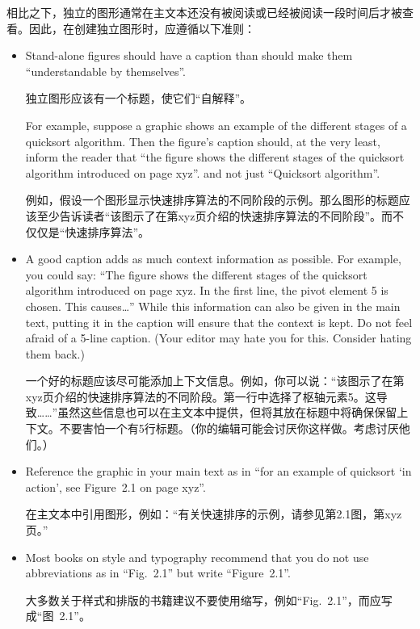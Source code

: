 相比之下，独立的图形通常在主文本还没有被阅读或已经被阅读一段时间后才被查看。因此，在创建独立图形时，应遵循以下准则：
%
\begin{itemize}
    \item Stand-alone figures should have a caption than should make them
        ``understandable by themselves''.

        独立图形应该有一个标题，使它们“自解释”。

        For example, suppose a graphic shows an example of the different
        stages of a quicksort algorithm. Then the figure's caption should, at
        the very least, inform the reader that ``the figure shows the
        different stages of the quicksort algorithm introduced on page xyz''.
        and not just ``Quicksort algorithm''.

        例如，假设一个图形显示快速排序算法的不同阶段的示例。那么图形的标题应该至少告诉读者“该图示了在第xyz页介绍的快速排序算法的不同阶段”。而不仅仅是“快速排序算法”。
    \item A good caption adds as much context information as possible. For
        example, you could say: ``The figure shows the different stages of
        the quicksort algorithm introduced on page xyz. In the first line,
        the pivot element 5 is chosen. This causes\dots'' While this
        information can also be given in the main text, putting it in the
        caption will ensure that the context is kept. Do not feel afraid of a
        5-line caption. (Your editor may hate you for this. Consider hating
        them back.)

        一个好的标题应该尽可能添加上下文信息。例如，你可以说：“该图示了在第xyz页介绍的快速排序算法的不同阶段。第一行中选择了枢轴元素5。这导致……”虽然这些信息也可以在主文本中提供，但将其放在标题中将确保保留上下文。不要害怕一个有5行标题。（你的编辑可能会讨厌你这样做。考虑讨厌他们。）
    \item Reference the graphic in your main text as in ``for an example of
        quicksort `in action', see Figure~2.1 on page xyz''.

        在主文本中引用图形，例如：“有关快速排序的示例，请参见第2.1图，第xyz页。”


    \item Most books on style and typography recommend that you do not use
        abbreviations as in ``Fig.~2.1'' but write ``Figure~2.1''.

        大多数关于样式和排版的书籍建议不要使用缩写，例如“Fig.~2.1”，而应写成“图~2.1”。



\end{itemize}
